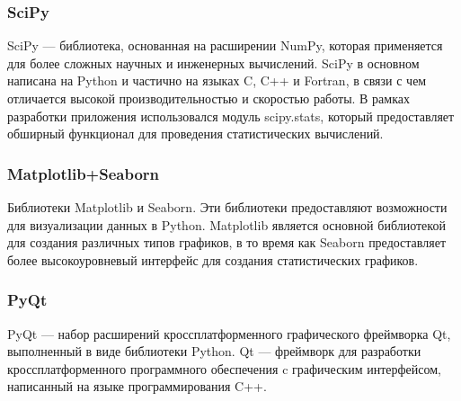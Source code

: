 


\subsubsection{SciPy}

SciPy --- библиотека, основанная на расширении NumPy, которая применяется для более сложных научных и инженерных вычислений. SciPy в основном написана на Python и частично на языках C, C++ и Fortran, в связи с чем отличается высокой производительностью и скоростью работы. В рамках разработки приложения использовался модуль scipy.stats, который предоставляет обширный функционал для проведения статистических вычислений.

\subsubsection{Matplotlib+Seaborn}

Библиотеки Matplotlib и Seaborn. Эти библиотеки предоставляют
возможности для визуализации данных в Python. Matplotlib является основной
библиотекой для создания различных типов графиков, в то время как Seaborn
предоставляет более высокоуровневый интерфейс для создания
статистических графиков.

\subsubsection{PyQt}

PyQt --- набор расширений кроссплатформенного графического фреймворка Qt, выполненный в виде библиотеки Python. Qt --- фреймворк для разработки кроссплатформенного программного обеспечения c графическим интерфейсом, написанный на языке программирования C++.

